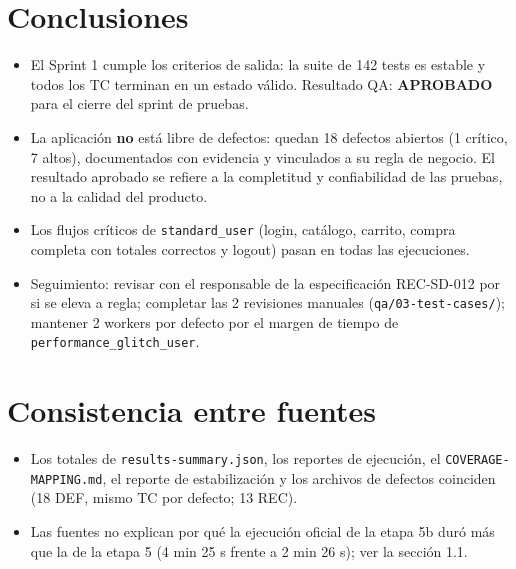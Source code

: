 \documentclass[10pt,a4paper]{article}
\newcommand{\status}[1]{\textcolor{secondary}{\bfseries #1}}
\begin{document}
\section{Conclusiones}
\begin{itemize}
  \item El Sprint 1 cumple los criterios de salida: la suite de 142 tests es estable y todos los TC terminan en un estado válido. Resultado QA: \status{APROBADO} para el cierre del sprint de pruebas.
  \item La aplicación \textbf{no} está libre de defectos: quedan 18 defectos abiertos (1 crítico, 7 altos), documentados con evidencia y vinculados a su regla de negocio. El resultado aprobado se refiere a la completitud y confiabilidad de las pruebas, no a la calidad del producto.
  \item Los flujos críticos de \texttt{standard\_user} (login, catálogo, carrito, compra completa con totales correctos y logout) pasan en todas las ejecuciones.
  \item Seguimiento: revisar con el responsable de la especificación REC-SD-012 por si se eleva a regla; completar las 2 revisiones manuales (\texttt{qa/03-test-cases/}); mantener 2 workers por defecto por el margen de tiempo de \texttt{performance\_\allowbreak glitch\_\allowbreak user}.
\end{itemize}

\section{Consistencia entre fuentes}
\begin{itemize}
  \item Los totales de \texttt{results-summary.json}, los reportes de ejecución, el \texttt{COVERAGE-MAPPING.md}, el reporte de estabilización y los archivos de defectos coinciden (18 DEF, mismo TC por defecto; 13 REC).
  \item Las fuentes no explican por qué la ejecución oficial de la etapa 5b duró más que la de la etapa 5 (4 min 25 s frente a 2 min 26 s); ver la sección 1.1.
\end{itemize}
\end{document}
